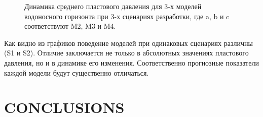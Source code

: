 \documentclass{article}
\begin{document}
\begin{figure}
{\begin{minipage}[h]{0.32\linewidth}
    \end{minipage} 
    \caption{Динамика среднего пластового давления для 3-х моделей водоносного горизонта при 3-х сценариях разработки, где a, b и c соответствуют M2, M3 и M4.}
    \label{fig:2din}
    }
\end{figure}
Как видно из графиков поведение моделей при одинаковых сценариях различны (S1 и S2). Отличие заключается не только в абсолютных значениях пластового давления, но и в динамике его изменения. Соответственно прогнозные показатели каждой модели будут существенно отличаться.

\section{CONCLUSIONS}
\end{document}
